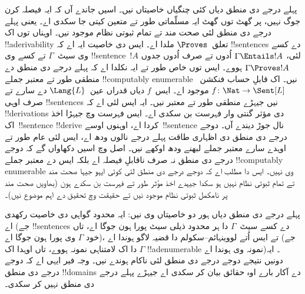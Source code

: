 \documentclass[../../../include/open-logic-section]{subfiles}
\begin{document}


پہلے درجے دی منطق دیاں کئی چنگیاں خاصیتاں نیں۔ اسیں جاندے آں کہ ایہ
فیصلہ کرن جوگ نہیں، پر گھٹ توں گھٹ ایہ مسلّماتی طور تے متعین کیتی جا سکدی
اے۔ یعنی پہلے درجے دی منطق لئی صحت مند تے تمام ثبوتی نظام موجود نیں۔ اوہناں توں اک !!a{derivability} تعلق~$\Proves$ ملدا اے۔ ایس دی خاصیت ایہ اے کہ !!{sentence}s دے کسے وی سیٹ~$\Gamma$ تے کسے وی
!!{sentence}~$!A$ لئی، $\Gamma \Entails !A$ اُدوں تے صرف اُدوں جدوں
$\Gamma \Proves !A$ ہووے۔ ایس توں خاص طور تے ایہ نکلدا اے کہ پہلے
درجے دی منطق دے منطقی طور تے معتبر جملے !!{computably
  enumerable} نیں۔ اک قابلِ حساب فنکشن~$f\colon \Nat \to
\Sent[L]$ موجود اے۔ ایس~$f$ دیاں قدراں عین~$\Lang{L}$ دے سارے تے صرف اوہی
!!{sentence}s نیں جیہڑے منطقی طور تے معتبر نیں۔ ایہ ایس لئی اے کہ
!!{derivation}s دی مؤثر گنتی وار فہرست بن سکدی اے۔ ایس فہرست وچ
جیہڑا اخذ اک~!!{sentence} !!{derive} کردا اے، اوہنوں اوسے~!!{sentence}
نال جوڑ دیندے آں۔ دوجے درجے دی منطق دی اظہاری طاقت پہلے درجے نالوں ودھ
اے، ایس لئی عام طور تے اوہدے سارے معتبر جملے لبھنے ودھ اوکھے نیں۔
اصل وچ اسیں دکھاواں گے کہ دوجے درجے دی منطق نہ صرف ناقابلِ فیصلہ اے
بلکہ ایس دے معتبر جملے !!{computably
  enumerable} وی نہیں۔ ایس دا مطلب اے کہ دوجے درجے دی منطق لئی کوئی
ایہو جیہا صحت مند تے تمام ثبوتی نظام نہیں ہو سکدا جیہدے اخذ مؤثر
طور تے فہرست بن سکدے ہون (بھاویں صحت مند پر نامکمل ثبوتی نظام موجود
نیں تے حقیقت وچ تحقیق دے اہم موضوع نیں)۔

پہلے درجے دی منطق دیاں ہور دو خاصیتاں وی نیں: ایہ محدود گواہی دی
خاصیت رکھدی اے (جے !!{sentence}s دے کسے سیٹ~$\Gamma$ دا ہر محدود
ذیلی سیٹ پورا ہون جوگا اے، تاں خود $\Gamma$ وی پورا ہون جوگا اے)،
تے ایس اُتے لووینہائم--سکولم دا قضیہ لاگو ہوندا اے (جے $\Gamma$
دا اک لامتناہی نمونہ ہووے، تاں اوہدا اک !!a{denumerable} نمونہ وی ہوندا اے)۔ ایہ دونیں نتیجے دوجے درجے دی
منطق لئی ناکام ہوندے نیں۔ وجہ فیر ایہی اے کہ دوجے درجے دی منطق
!!{domain}s دے آکار بارے اوہ حقائق بیان کر سکدی اے جیہڑے پہلے درجے
دی منطق نہیں کر سکدی۔
\end{document}
